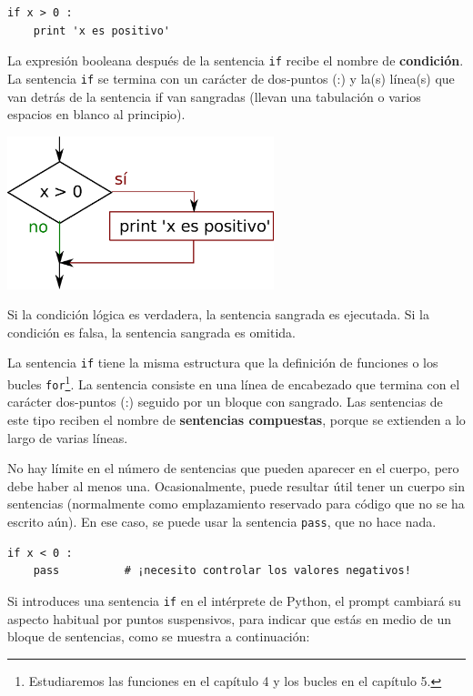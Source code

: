 \beforeverb
\begin{verbatim}
if x > 0 :
    print 'x es positivo'
\end{verbatim}
\afterverb
%
La expresión booleana después de la sentencia {\tt if} recibe
el nombre de {\bf condición}. La sentencia {\tt if} se termina
con un carácter de dos-puntos (:) y la(s) línea(s) que van detrás de
la sentencia if van sangradas (llevan una tabulación o varios espacios en blanco al principio).

\beforefig
\centerline{\includegraphics[height=1.75in]{figs2/if.eps}}
\afterfig

Si la condición lógica es verdadera, la sentencia sangrada
es ejecutada. Si la condición es falsa,
la sentencia sangrada es omitida.


La sentencia {\tt if} tiene la misma estructura que la definición de funciones
o los bucles {\tt for}\footnote{Estudiaremos las funciones en el capítulo 4
y los bucles en el capítulo 5.}. La sentencia consiste en una línea de encabezado
que termina con el carácter dos-puntos (:)
seguido por un bloque con sangrado. Las sentencias de este tipo
reciben el nombre de {\bf sentencias compuestas}, porque se extienden
a lo largo de varias líneas.

No hay límite en el número de sentencias que pueden aparecer en el
cuerpo, pero debe haber al menos una.
Ocasionalmente, puede resultar útil tener un cuerpo sin sentencias
(normalmente como emplazamiento reservado para código que no se ha escrito aún). En ese
caso, se puede usar la sentencia {\tt pass}, que no hace nada.


\beforeverb
\begin{verbatim}
if x < 0 :
    pass          # ¡necesito controlar los valores negativos!
\end{verbatim}
\afterverb
%
Si introduces una sentencia {\tt if} en el intérprete de Python, el prompt cambiará
su aspecto habitual por puntos suspensivos, para indicar que estás en medio de un bloque de sentencias, como
se muestra a continuación:

